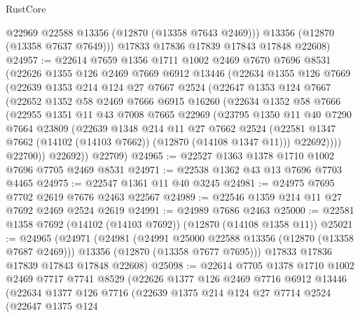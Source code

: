 \begin{lexlean}{RustCore}
\begin{coremodule}
          @22969
          @22588
          @13356
          (@12870 (@13358 @7643 @2469)))
        @13356
        (@12870 (@13358 @7637 @7649)))
      @17833
      @17836
      @17839
      @17843
      @17848
      @22608)
@24957 := @22614
    @7659
    @1356
    @1711
    @1002
    @2469
    @7670
    @7696
    @8531
    (@22626
      @1355
      @126
      @2469
      @7669
      @6912
      @13446
      (@22634
        @1355
        @126
        @7669
        (@22639
          @1353
          @214
          @124
          @27
          @7667
          @2524
          (@22647
            @1353
            @124
            @7667
            (@22652
              @1352
              @58
              @2469
              @7666
              @6915
              @16260
              (@22634
                @1352
                @58
                @7666
                (@22955
                  @1351
                  @11
                  @43
                  @7008
                  @7665
                  @22969
                  (@23795
                    @1350
                    @11
                    @40
                    @7290
                    @7664
                    @23809
                    (@22639
                      @1348
                      @214
                      @11
                      @27
                      @7662
                      @2524
                      (@22581 @1347 @7662 (@14102 (@14103 @7662)) (@12870 (@14108 @1347 @11)))
                      @22692))))
              @22700))
          @22692))
      @22709)
@24965 := @22527 @1363 @1378 @1710 @1002 @7696 @7705 @2469 @8531
@24971 := @22538 @1362 @43 @13 @7696 @7703 @4465
@24975 := @22547 @1361 @11 @40 @3245
@24981 := @24975 @7695 @7702 @2619 @7676 @2463 @22567
@24989 := @22546 @1359 @214 @11 @27 @7692 @2469 @2524 @2619
@24991 := @24989 @7686 @2463
@25000 := @22581 @1358 @7692 (@14102 (@14103 @7692)) (@12870 (@14108 @1358 @11))
@25021 := @24965
    (@24971
      (@24981
        (@24991 @25000 @22588 @13356 (@12870 (@13358 @7687 @2469)))
        @13356
        (@12870 (@13358 @7677 @7695)))
      @17833
      @17836
      @17839
      @17843
      @17848
      @22608)
@25098 := @22614
    @7705
    @1378
    @1710
    @1002
    @2469
    @7717
    @7741
    @8529
    (@22626
      @1377
      @126
      @2469
      @7716
      @6912
      @13446
      (@22634
        @1377
        @126
        @7716
        (@22639
          @1375
          @214
          @124
          @27
          @7714
          @2524
          (@22647
            @1375
            @124

\end{coremodule}
\end{lexlean}
